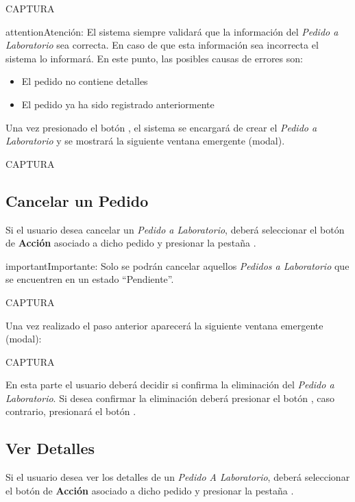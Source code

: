 \documentclass[a4paper,10pt,spanish]{sphinxmanual}
\begin{document}
CAPTURA

\begin{notice}{attention}{Atención:}
El sistema siempre validará que la información del \emph{Pedido a Laboratorio} sea correcta. En caso de que esta información sea incorrecta el sistema lo informará.
En este punto, las posibles causas de errores son:
\begin{itemize}
\item {} 
El pedido no contiene detalles

\item {} 
El pedido ya ha sido registrado anteriormente

\end{itemize}
\end{notice}

Una vez presionado el botón , el sistema se encargará de crear el \emph{Pedido a Laboratorio} y se mostrará la siguiente ventana emergente (modal).

CAPTURA


\subsection{Cancelar un Pedido}
\label{pedidosalab:cancelar-un-pedido}\label{pedidosalab:cancelar-pedido-pl}
Si el usuario desea cancelar un \emph{Pedido a Laboratorio}, deberá seleccionar el botón de \textbf{Acción} asociado a dicho pedido y presionar la pestaña .

\begin{notice}{important}{Importante:}
Solo se podrán cancelar aquellos \emph{Pedidos a Laboratorio} que se encuentren en un estado “Pendiente”.
\end{notice}

CAPTURA

Una vez realizado el paso anterior aparecerá la siguiente ventana emergente (modal):

CAPTURA

En esta parte el usuario deberá decidir si confirma la eliminación del \emph{Pedido a Laboratorio}. Si desea confirmar la eliminación deberá presionar el botón , caso contrario, presionará el botón .


\subsection{Ver Detalles}
\label{pedidosalab:ver-detalles}\label{pedidosalab:ver-detalles-pl}
Si el usuario desea ver los detalles de un \emph{Pedido A Laboratorio}, deberá seleccionar el botón de \textbf{Acción} asociado a dicho pedido y presionar la pestaña .
\end{document}

